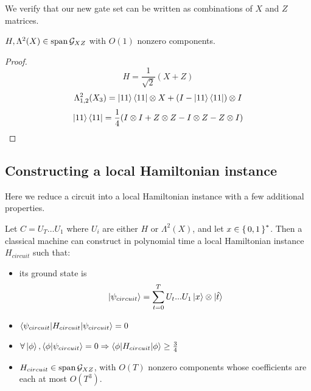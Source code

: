We verify that our new gate set can be written as combinations of $X$ and $Z$ matrices.

\begin{theorem}
	$H,\Lambda^2(X)\in\operatorname*{\operatorname{span}}\mathcal{G}_{XZ}$ with $O(1)$ nonzero components.
\end{theorem}

\begin{proof}
	$$H=\frac{1}{\sqrt{2}}(X+Z)$$
	$$\Lambda^2_{1,2}(X_3)=\ket{11}\bra{11}\otimes X+(I-\ket{11}\bra{11})\otimes I$$
	$$\ket{11}\bra{11}=\frac{1}{4}(I\otimes I+Z\otimes Z-I\otimes Z-Z\otimes I)$$
\end{proof}

\subsection{Constructing a local Hamiltonian instance}

Here we reduce a circuit into a local Hamiltonian instance with a few additional properties.

\begin{theorem}
	Let $C=U_T\ldots U_1$ where $U_i$ are either $H$ or $\Lambda^2(X)$, and let $x\in\set{0, 1}^*$. Then a classical machine can construct in polynomial time a local Hamiltonian instance $H_{circuit}$ such that:
	\begin{itemize}
		\item its ground state is $$\ket{\psi_{circuit}}=\sum_{t=0}^TU_t...U_1\ket{x}\otimes\ket{\hat{t}}$$
		\item $\braket{\psi_{circuit}|H_{circuit}|\psi_{circuit}}=0$
		\item $\forall\ket\phi,\braket{\phi|\psi_{circuit}}=0\Rightarrow\braket{\phi|H_{circuit}|\phi}\geq\frac{3}{4}$
		\item $H_{circuit}\in\operatorname*{\operatorname{span}}\mathcal{G}_{XZ}$, with $O(T)$ nonzero components whose coefficients are each at most $O(T^3)$.
	\end{itemize}
\end{theorem}

